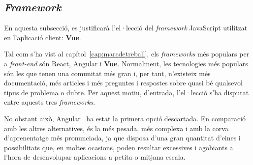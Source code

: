 \documentclass[a4paper,12pt]{ThesisStyle}
\begin{document}
\subsection{\textit{Framework}}
\label{subsec:decisions_client_framework}

En aquesta subsecció, es justificarà l'el·lecció del \textit{framework} JavaScript utilitzat en l'aplicació client: \textbf{Vue}.

Tal com s'ha vist al capítol~\ref{cap:marcdetreball}, els \textit{frameworks} més populars per a \textit{front-end} són React, Angular i \textbf{Vue}. Normalment, les tecnologies més populars són les que tenen una comunitat més gran i, per tant, n'existeix més documentació, més articles i més preguntes i respostes sobre quasi bé qualsevol tipus de problema o dubte. Per aquest motiu, d'entrada, l'el·lecció s'ha disputat entre aquests tres \textit{frameworks}.

No obstant això, Angular~\cite{Angular} ha estat la primera opció descartada. En comparació amb les altres alternatives, és la més pesada, més complexa i amb la corva d'aprenentatge més pronunciada, ja que disposa d'una gran quantitat d'eines i possibilitats que, en moltes ocasions, poden resultar excessives i agobiants a l'hora de desenvolupar aplicacions a petita o mitjana escala.
\end{document}
